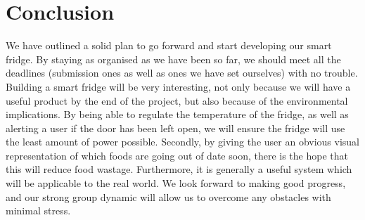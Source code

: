 \documentclass[10pt]{article}
\begin{document}
\section{Conclusion}

We have outlined a solid plan to go forward and start developing our smart fridge. By staying as organised as we have been so far, we should meet all the deadlines (submission ones as well as ones we have set ourselves) with no trouble. Building a smart fridge will be very interesting, not only because we will have a useful product by the end of the project, but also because of the environmental implications. By being able to regulate the temperature of the fridge, as well as alerting a user if the door has been left open, we will ensure the fridge will use the least amount of power possible. Secondly, by giving the user an obvious visual representation of which foods are going out of date soon, there is the hope that this will reduce food wastage. Furthermore, it is generally a useful system which will be applicable to the real world. We look forward to making good progress, and our strong group dynamic will allow us to overcome any obstacles with minimal stress.
\end{document}
